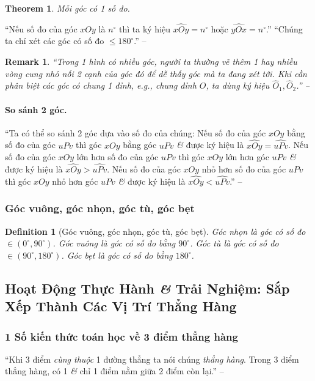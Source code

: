 \documentclass{article}
\numberwithin{equation}{section}
\newtheorem{definition}{Definition}[section]
\newtheorem{remark}{Remark}[section]
\newtheorem{theorem}{Theorem}[section]
\begin{document}
\begin{theorem}
	Mỗi góc có 1 số đo.
\end{theorem}
``Nếu số đo của góc $xOy$ là $n^\circ$ thì ta ký hiệu $\widehat{xOy} = n^\circ$ hoặc $\widehat{yOx} = n^\circ$.'' ``Chúng ta chỉ xét các góc có số đo $\le 180^\circ$.'' -- \cite[p. 96]{Thai_Anh_Dat_Ha_Loan_Nam_Quang_Toan_6_tap_2}

\begin{remark}
	``Trong 1 hình có nhiều góc, người ta thường vẽ thêm 1 hay nhiều vòng cung nhỏ nối 2 cạnh của góc đó để dễ thấy góc mà ta đang xét tới. Khi cần phân biệt các góc có chung 1 đỉnh, e.g., chung đỉnh $O$, ta dùng ký hiệu $\widehat{O}_1,\widehat{O}_2$.'' -- \cite[p. 98]{Thai_Anh_Dat_Ha_Loan_Nam_Quang_Toan_6_tap_2}
\end{remark}

\paragraph{So sánh 2 góc.} ``Ta có thể so sánh 2 góc dựa vào số đo của chúng: Nếu số đo của góc $xOy$ bằng số đo của góc $uPv$ thì góc $xOy$ bằng góc $uPv$ \textit{\&} được ký hiệu là $\widehat{xOy} = \widehat{uPv}$. Nếu số đo của góc $xOy$ lớn hơn số đo của góc $uPv$ thì góc $xOy$ lớn hơn góc $uPv$ \textit{\&} được ký hiệu là $\widehat{xOy} > \widehat{uPv}$. Nếu số đo của góc $xOy$ nhỏ hơn số đo của góc $uPv$ thì góc $xOy$ nhỏ hơn góc $uPv$ \textit{\&} được ký hiệu là $\widehat{xOy} < \widehat{uPv}$.'' -- \cite[p. 98]{Thai_Anh_Dat_Ha_Loan_Nam_Quang_Toan_6_tap_2}

\subsubsection{Góc vuông, góc nhọn, góc tù, góc bẹt}

\begin{definition}[Góc vuông, góc nhọn, góc tù, góc bẹt]
	\emph{Góc nhọn} là góc có số đo $\in(0^\circ,90^\circ)$. \emph{Góc vuông} là góc có số đo bằng $90^\circ$. \emph{Góc tù} là góc có số đo $\in(90^\circ,180^\circ)$. \emph{Góc bẹt} là góc có số đo bằng $180^\circ$.
\end{definition}

\subsection{Hoạt Động Thực Hành \textit{\&} Trải Nghiệm: Sắp Xếp Thành Các Vị Trí Thẳng Hàng}

\subsubsection{1 Số kiến thức toán học về 3 điểm thẳng hàng}
``Khi 3 điểm \textit{cùng thuộc} 1 đường thẳng ta nói chúng \textit{thẳng hàng}. Trong 3 điểm thẳng hàng, có 1 \textit{\&} chỉ 1 điểm nằm giữa 2 điểm còn lại.'' -- \cite[p. 104]{Thai_Anh_Dat_Ha_Loan_Nam_Quang_Toan_6_tap_2}
\end{document}

